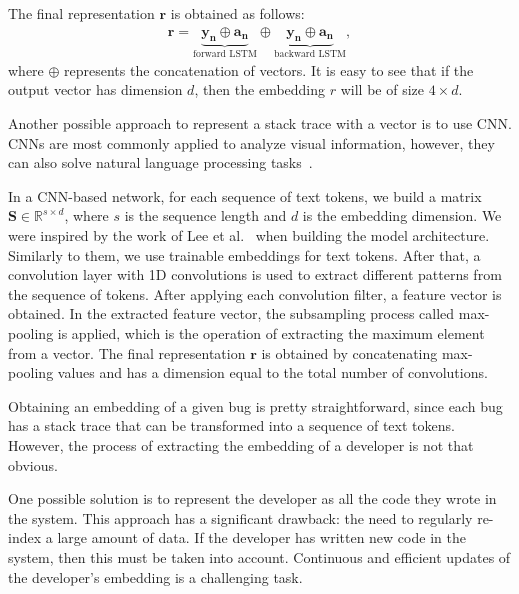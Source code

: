 The final representation $\mathbf{r}$ is obtained as follows:
\begin{align}
    \mathbf{r} = \underbrace{\mathbf{y_n} \oplus \mathbf{a_n}}_\text{forward LSTM} \oplus \underbrace{\mathbf{y_n} \oplus \mathbf{a_n}}_\text{backward LSTM},
\end{align}
where $\oplus$ represents the concatenation of vectors. It is easy to see that if the output vector has dimension $d$, then the embedding $r$ will be of size $4 \times d$.


Another possible approach to represent a stack trace with a vector is to use CNN. CNNs are most commonly applied to analyze visual information, however, they can also solve natural language processing tasks~\cite{Collobert2008AUA}.

In a CNN-based network, for each sequence of text tokens, we build a matrix $\mathbf{S} \in \mathbb{R}^{s \times d}$, where $s$ is the sequence length and $d$ is the embedding dimension. We were inspired by the work of Lee et al.~\cite{Lee2017ApplyingDL} when building the model architecture. Similarly to them, we use trainable embeddings for text tokens. After that, a convolution layer with 1D convolutions is used to extract different patterns from the sequence of tokens. After applying each convolution filter, a feature vector is obtained. In the extracted feature vector, the subsampling process called max-pooling is applied, which is the operation of extracting the maximum element from a vector. The final representation $\mathbf{r}$ is obtained by concatenating max-pooling values and has a dimension equal to the total number of convolutions.

\label{sec:dev-representation}
Obtaining an embedding of a given bug is pretty straightforward, since each bug has a stack trace that can be transformed into a sequence of text tokens. However, the process of extracting the embedding of a developer is not that obvious. 

One possible solution is to represent the developer as all the code they wrote in the system. This approach has a significant drawback: the need to regularly re-index a large amount of data. If the developer has written new code in the system, then this must be taken into account. Continuous and efficient updates of the developer's embedding is a challenging task. 

